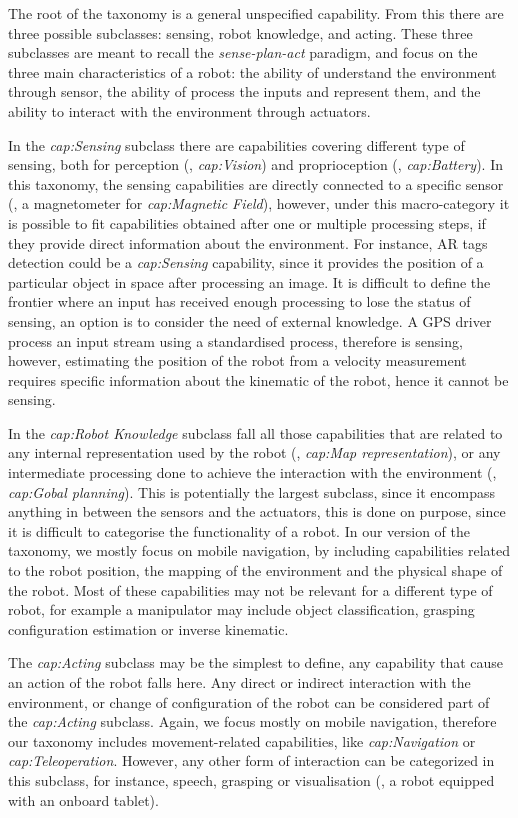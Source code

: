 The root of the taxonomy is a general unspecified capability. From this there are three possible subclasses: sensing, robot knowledge, and acting. These three subclasses are meant to recall the \textit{sense-plan-act} paradigm, and focus on the three main characteristics of a robot: the ability of understand the environment through sensor, the ability of process the inputs and represent them, and the ability to interact with the environment through actuators.

In the \textit{cap:Sensing} subclass there are capabilities covering different type of sensing, both for perception (\eg, \textit{cap:Vision}) and proprioception (\eg, \textit{cap:Battery}). In this taxonomy, the sensing capabilities are directly connected to a specific sensor (\eg, a magnetometer for \textit{cap:Magnetic Field}), however, under this macro-category it is possible to fit capabilities obtained after one or multiple processing steps, if they provide direct information about the environment. For instance, AR tags detection could be a \textit{cap:Sensing} capability, since it provides the position of a particular object in space after processing an image. It is difficult to define the frontier where an input has received enough processing to lose the status of sensing, an option is to consider the need of external knowledge.  A GPS driver process an input stream using a standardised process, therefore is sensing, however, estimating the position of the robot from a velocity measurement requires specific information about the kinematic of the robot, hence it cannot be sensing.

In the \textit{cap:Robot Knowledge} subclass fall all those capabilities that are related to any internal representation used by the robot (\eg, \textit{cap:Map representation}), or any intermediate processing done to achieve the interaction with the environment (\eg, \textit{cap:Gobal planning}). This is potentially the largest subclass, since it encompass anything in between the sensors and the actuators, this is done on purpose, since it is difficult to categorise the functionality of a robot. In our version of the taxonomy, we mostly focus on mobile navigation, by including capabilities related to the robot position, the mapping of the environment and the physical shape of the robot. Most of these capabilities may not be relevant for a different type of robot, for example a manipulator may include object classification, grasping configuration estimation or inverse kinematic.

The \textit{cap:Acting} subclass may be the simplest to define, any capability that cause an action of the robot falls here. Any direct or indirect interaction with the environment, or change of configuration of the robot can be considered part of the \textit{cap:Acting} subclass. Again, we focus mostly on mobile navigation, therefore our taxonomy includes movement-related capabilities, like \textit{cap:Navigation} or \textit{cap:Teleoperation}. However, any other form of interaction can be categorized in this subclass, for instance, speech, grasping or visualisation (\eg, a robot equipped with an onboard tablet).

